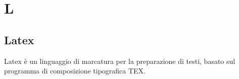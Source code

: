 \section{L}
\subsection{Latex}
Latex è un linguaggio di marcatura per la preparazione di testi, basato sul programma di composizione tipografica TEX.
\clearpage